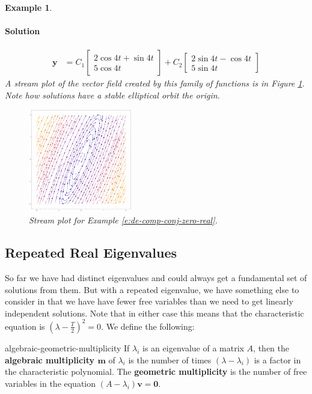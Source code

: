 \documentclass[letterpaper, 11pt, openany]{book}
\theoremstyle{mytheoremstyle}
\theoremstyle{myexamplestyle}
\newtheorem{example}{Example}[section]
\newenvironment{solution}{\paragraph{\sffamily \smaller \fontseries{b}\selectfont Solution}}{\hfill\faSquare}
\begin{document}
\begin{example}
\begin{solution}
\begin{align*}
            \mathbf{y}  &=C_{1}\begin{bmatrix}2 \cos 4t + \sin 4t \\ 5 \cos 4t\end{bmatrix} + C_{2}\begin{bmatrix}2\sin 4t - \cos 4t \\ 5 \sin 4t\end{bmatrix}                      
        \end{align*}
        A stream plot of the vector field created by this family of functions is in Figure \ref{f:de-comp-conj-zero-real}. Note how solutions have a stable elliptical orbit the origin.
        \begin{figure}[htbp]
            \centering
                \includegraphics[width=0.4\textwidth]{Figures/de-stream-complex-zero-re.pdf}
            \caption{Stream plot for Example \ref{e:de-comp-conj-zero-real}.}
            \label{f:de-comp-conj-zero-real}
        \end{figure}
    \end{solution}
\end{example}

\subsection{Repeated Real Eigenvalues}
So far we have had distinct eigenvalues and could always get a fundamental set of solutions from them. But with a repeated eigenvalue, we have something else to consider in that we have have fewer free variables than we need to get linearly independent solutions. Note that in either case this means that the characteristic equation is \(\left(\lambda - \frac{T}{2}\right)^{2} = 0\). We define the following:

\begin{definition}{}{algebraic-geometric-multiplicity}
    If \(\lambda_{i}\) is an eigenvalue of a matrix \(A\), then the \textbf{algebraic multiplicity \(\bm{m}\)} of \(\lambda_{i}\) is the number of times \((\lambda - \lambda_{i})\) is a factor in the characteristic polynomial. The \textbf{geometric multiplicity} is the number of free variables in the equation \((A - \lambda_{i})\mathbf{v} = \mathbf{0}\).
\end{definition}
\end{document}
